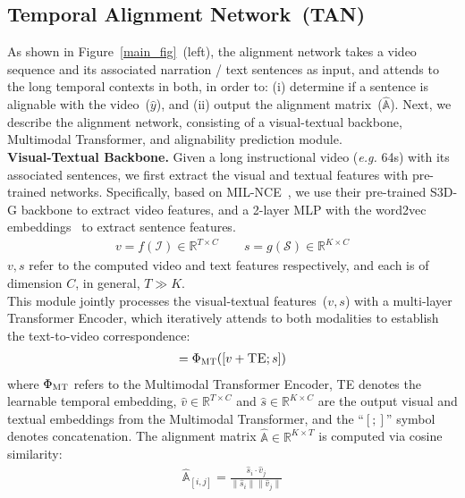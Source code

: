 \vspace{1mm}
\subsection{Temporal Alignment Network~(TAN)}
\label{subsec:tan}
As shown in Figure~\ref{main_fig}~(left), 
the alignment network takes a video sequence and its associated narration / text sentences as input,
and attends to the long temporal contexts in both, in order to:
(i) determine if a sentence is alignable with the video~($\hat{y}$), and
(ii) output the alignment matrix~($\hat{\mathbb{A}}$).
Next, we describe the alignment network, consisting of a visual-textual backbone, 
Multimodal Transformer, and alignability prediction module.\\[-6pt]

\noindent \textbf{Visual-Textual Backbone. }
Given a long instructional video ({\em e.g.} 64s) with its associated sentences,
we first extract the visual and textual features with pre-trained networks.
Specifically, based on MIL-NCE~\cite{Miech20},
we use their pre-trained S3D-G backbone to extract video features,
and a 2-layer MLP with the word2vec embeddings~\cite{Mikolov13a} to extract sentence features.
\vspace{-1mm}
\begin{align}
    v = f(\mathcal{I}) \in \mathbb{R}^{T\times C}\quad\quad
    s = g(\mathcal{S}) \in \mathbb{R}^{K\times C}
\end{align}
$v, s$ refer to the computed video and text features respectively,
and each is of dimension $C$, in general, $T \gg K$.\\[-6pt]

\vspace{-1mm}
This module jointly processes the visual-textual features~($v, s$) with a multi-layer Transformer Encoder, 
which iteratively attends to both modalities to establish the text-to-video correspondence:
\vspace{-1mm}
\begin{align}
    [\hat{v}; \hat{s}] = \Phi_{\textsc{MT}}([v+\textsc{TE}; s])
\end{align}
where $\Phi_{\textsc{MT}}$ refers to the Multimodal Transformer Encoder,
\textsc{TE} denotes the learnable temporal embedding,
$\hat{v}\in \mathbb{R}^{T\times C}$ and $\hat{s}\in \mathbb{R}^{K \times C}$ are 
the output visual and textual embeddings from the Multimodal Transformer, and the
``$[;]$'' symbol denotes concatenation.
The alignment matrix $\hat{\mathbb{A}} \in \mathbb{R}^{K \times T}$ is computed via cosine similarity:
\vspace{-1mm}
\begin{align}
    \hat{\mathbb{A}}_{[i,j]} = \frac{\hat{s}_i \cdot \hat{v}_j}{\|\hat{s}_i\| \|\hat{v}_j\|} 
\end{align}

